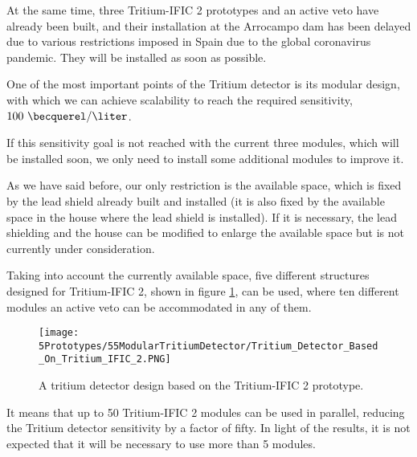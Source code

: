 At the same time, three Tritium-IFIC 2 prototypes and an active veto have already been built, and their installation at the Arrocampo dam has been delayed due to various restrictions imposed in Spain due to the global coronavirus pandemic. They will be installed as soon as possible.

One of the most important points of the Tritium detector is its modular design, with which we can achieve scalability to reach the required sensitivity, $100~\becquerel/\liter$. 

If this sensitivity goal is not reached with the current three modules, which will be installed soon, we only need to install some additional modules to improve it.

As we have said before, our only restriction is the available space, which is fixed by the lead shield already built and installed (it is also fixed by the available space in the house where the lead shield is installed). If it is necessary, the lead shielding and the house can be modified to enlarge the available space but is not currently under consideration.

Taking into account the currently available space, five different structures designed for Tritium-IFIC 2, shown in figure \ref{fig:TritiumMonitorIFIC2Design}, can be used, where ten different modules an active veto can be accommodated in any of them. 

\begin{figure}[h]
\centering
\texttt{[image: 5Prototypes/55ModularTritiumDetector/Tritium\_Detector\_Based\_On\_Tritium\_IFIC\_2.PNG]}
\caption{A tritium detector design based on the Tritium-IFIC 2 prototype.\label{fig:TritiumMonitorIFIC2Design}}
\end{figure}

It means that up to 50 Tritium-IFIC 2 modules can be used in parallel, reducing the Tritium detector sensitivity by a factor of fifty. In light of the results, it is not expected that it will be necessary to use more than 5 modules.